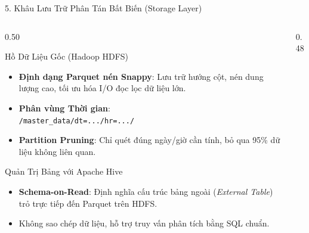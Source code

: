 \documentclass[aspectratio=169,10pt]{beamer}
\begin{document}
\begin{frame}{5. Khâu Lưu Trữ Phân Tán Bất Biến (Storage Layer)}
\begin{columns}[T]
    \begin{column}{0.50\textwidth}
        \begin{block}{Hồ Dữ Liệu Gốc (Hadoop HDFS)}
            \begin{itemize}\setlength{\itemsep}{2pt}\footnotesize
                \item \textbf{Định dạng Parquet nén Snappy}: Lưu trữ hướng cột, nén dung lượng cao, tối ưu hóa I/O đọc lọc dữ liệu lớn.
                \item \textbf{Phân vùng Thời gian}:\\
                \texttt{/master\_data/dt=.../hr=.../}
                \item \textbf{Partition Pruning}: Chỉ quét đúng ngày/giờ cần tính, bỏ qua 95\% dữ liệu không liên quan.
            \end{itemize}
        \end{block}
        \vspace{2pt}
        \begin{block}{Quản Trị Bảng với Apache Hive}
            \begin{itemize}\setlength{\itemsep}{2pt}\footnotesize
                \item \textbf{Schema-on-Read}: Định nghĩa cấu trúc bảng ngoài (\textit{External Table}) trỏ trực tiếp đến Parquet trên HDFS.
                \item Không sao chép dữ liệu, hỗ trợ truy vấn phân tích bằng SQL chuẩn.
            \end{itemize}
        \end{block}
    \end{column}

    \begin{column}{0.48\textwidth}
        \centering
\end{column}
\end{columns}
\end{frame}
\end{document}
